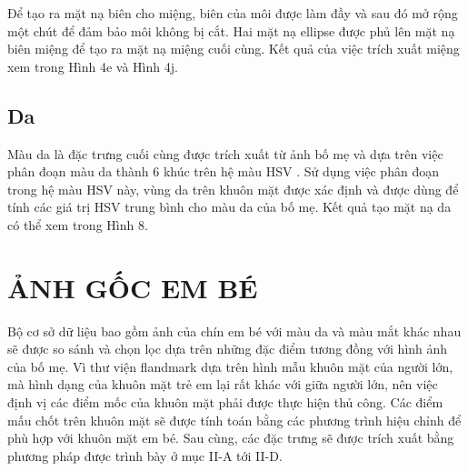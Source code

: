 \documentclass[conference]{IEEEtran}
\begin{document}
Để tạo ra mặt nạ biên cho miệng, biên của môi được làm đầy và sau đó mở rộng một chút để đảm bảo môi không bị cắt. Hai mặt nạ ellipse được phủ lên mặt nạ biên miệng để tạo ra mặt nạ miệng cuối cùng. Kết quả của việc trích xuất miệng xem trong Hình 4e và Hình 4j.

\subsection{Da}
Màu da là đặc trưng cuối cùng được trích xuất từ ảnh bố mẹ và dựa trên việc phân đoạn màu da thành 6 khúc trên hệ màu HSV \cite{ref:r9}. Sử dụng việc phân đoạn trong hệ màu HSV này, vùng da trên khuôn mặt được xác định và được dùng để tính các giá trị HSV trung bình cho màu da của bố mẹ. Kết quả tạo mặt nạ da có thể xem trong Hình 8.



\section{ẢNH GỐC EM BÉ}
Bộ cơ sở dữ liệu bao gồm ảnh của chín em bé với màu da và màu mắt khác nhau sẽ được so sánh và chọn lọc dựa trên những đặc điểm tương đồng với hình ảnh của bố mẹ. Vì thư viện flandmark dựa trên hình mẫu khuôn mặt của người lớn, mà hình dạng của khuôn mặt trẻ em lại rất khác với giữa người lớn, nên việc định vị các điểm mốc của khuôn mặt phải được thực hiện thủ công. Các điểm mấu chốt trên khuôn mặt sẽ được tính toán bằng các phương trình hiệu chỉnh để phù hợp với khuôn mặt em bé. Sau cùng, các đặc trưng sẽ được trích xuất bằng phương pháp được trình bày ở mục II-A tới II-D. 
\end{document}
